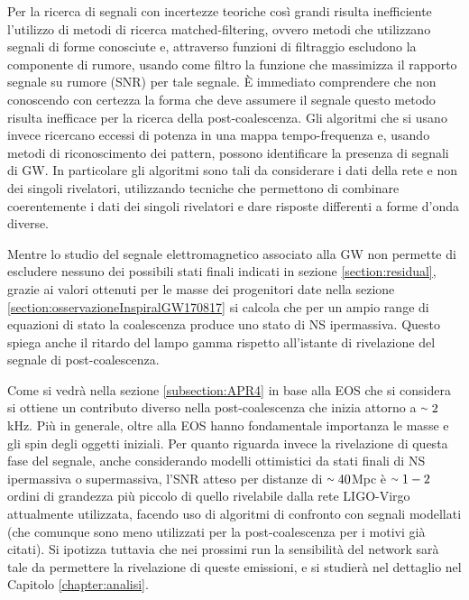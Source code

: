 Per la ricerca di segnali con incertezze teoriche così grandi risulta inefficiente l'utilizzo di metodi di ricerca matched-filtering, ovvero metodi che utilizzano segnali di forme conosciute e, attraverso funzioni di filtraggio escludono la componente di rumore, usando come filtro la funzione che massimizza il rapporto segnale su rumore (SNR) per tale segnale\cite{maggiore2008gravitational}. È immediato comprendere che non conoscendo con certezza la forma che deve assumere il segnale questo metodo risulta inefficace per la ricerca della post-coalescenza. Gli algoritmi che si usano invece ricercano eccessi di potenza in una mappa tempo-frequenza e, usando metodi di riconoscimento dei pattern, possono identificare la presenza di segnali di GW. In particolare gli algoritmi sono tali da considerare i dati della rete e non dei singoli rivelatori, utilizzando tecniche che permettono di combinare coerentemente i dati dei singoli rivelatori e dare risposte differenti a forme d'onda diverse.

Mentre lo studio del segnale elettromagnetico associato alla GW non permette di escludere nessuno dei possibili stati finali indicati in sezione \ref{section:residual}, grazie ai valori ottenuti per le masse dei progenitori date nella sezione \ref{section:osservazioneInspiralGW170817} si calcola che per un ampio range di equazioni di stato la coalescenza produce uno stato di NS ipermassiva. Questo spiega anche il ritardo del lampo gamma rispetto all'istante di rivelazione del segnale di post-coalescenza. 

Come si vedrà nella sezione \ref{subsection:APR4} in base alla EOS che si considera si ottiene un contributo diverso nella post-coalescenza che inizia attorno a $\smallsim2$kHz. Più in generale, oltre alla EOS hanno fondamentale importanza le masse e gli spin degli oggetti iniziali. 
Per quanto riguarda invece la rivelazione di questa fase del segnale, anche considerando modelli ottimistici da stati finali di NS ipermassiva o supermassiva, l'SNR atteso per distanze di $\smallsim40$Mpc è $\smallsim1-2$ ordini di grandezza più piccolo di quello rivelabile dalla rete LIGO-Virgo attualmente utilizzata, facendo uso di algoritmi di confronto con segnali modellati (che comunque sono meno utilizzati per la post-coalescenza per i motivi già citati).
Si ipotizza tuttavia che nei prossimi run la sensibilità del network sarà tale da permettere la rivelazione di queste emissioni\cite{Abbott_2017b}, e si studierà nel dettaglio nel Capitolo \ref{chapter:analisi}.

